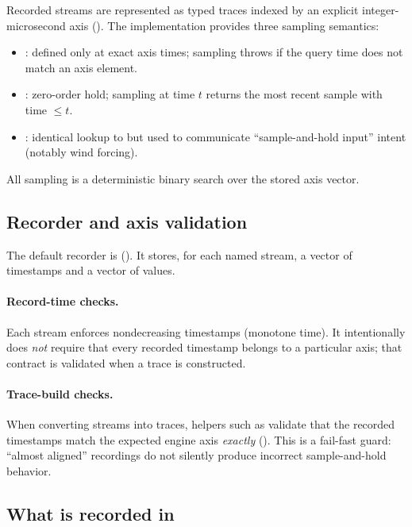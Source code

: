 Recorded streams are represented as typed traces indexed by an explicit integer-microsecond axis (). The implementation provides three sampling semantics:
\begin{itemize}[leftmargin=*,itemsep=2pt]
  \item \textbf{}: defined only at exact axis times; sampling throws if the query time does not match an axis element.
  \item \textbf{}: zero-order hold; sampling at time $t$ returns the most recent sample with time $\le t$.
  \item \textbf{}: identical lookup to  but used to communicate ``sample-and-hold input'' intent (notably wind forcing).
\end{itemize}
All sampling is a deterministic binary search over the stored axis vector.

\subsection{Recorder and axis validation}

The default recorder is  (). It stores, for each named stream, a vector of timestamps and a vector of values.

\paragraph{Record-time checks.}
Each stream enforces nondecreasing timestamps (monotone time). It intentionally does \emph{not} require that every recorded timestamp belongs to a particular axis; that contract is validated when a trace is constructed.

\paragraph{Trace-build checks.}
When converting streams into traces, helpers such as  validate that the recorded timestamps match the expected engine axis \emph{exactly} (). This is a fail-fast guard: ``almost aligned'' recordings do not silently produce incorrect sample-and-hold behavior.

\subsection{What is recorded in \texorpdfstring{}{mode=:record}}
\label{sec:recorded-streams}

